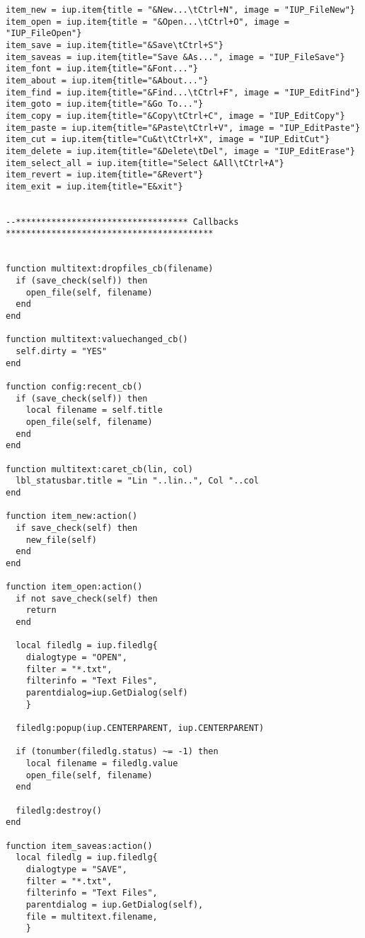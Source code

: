 \documentclass{ctexart}
\begin{document}
\begin{lstlisting}
item_new = iup.item{title = "&New...\tCtrl+N", image = "IUP_FileNew"}
item_open = iup.item{title = "&Open...\tCtrl+O", image = "IUP_FileOpen"}
item_save = iup.item{title="&Save\tCtrl+S"}
item_saveas = iup.item{title="Save &As...", image = "IUP_FileSave"}
item_font = iup.item{title="&Font..."}
item_about = iup.item{title="&About..."}
item_find = iup.item{title="&Find...\tCtrl+F", image = "IUP_EditFind"}
item_goto = iup.item{title="&Go To..."}
item_copy = iup.item{title="&Copy\tCtrl+C", image = "IUP_EditCopy"}
item_paste = iup.item{title="&Paste\tCtrl+V", image = "IUP_EditPaste"}
item_cut = iup.item{title="Cu&t\tCtrl+X", image = "IUP_EditCut"}
item_delete = iup.item{title="&Delete\tDel", image = "IUP_EditErase"}
item_select_all = iup.item{title="Select &All\tCtrl+A"}
item_revert = iup.item{title="&Revert"}
item_exit = iup.item{title="E&xit"}


--********************************** Callbacks *****************************************


function multitext:dropfiles_cb(filename)
  if (save_check(self)) then
    open_file(self, filename)
  end
end

function multitext:valuechanged_cb()
  self.dirty = "YES"
end

function config:recent_cb()
  if (save_check(self)) then
    local filename = self.title
    open_file(self, filename)
  end
end

function multitext:caret_cb(lin, col)
  lbl_statusbar.title = "Lin "..lin..", Col "..col
end

function item_new:action()
  if save_check(self) then
    new_file(self)
  end
end

function item_open:action()
  if not save_check(self) then
    return
  end
  
  local filedlg = iup.filedlg{
    dialogtype = "OPEN", 
    filter = "*.txt", 
    filterinfo = "Text Files", 
    parentdialog=iup.GetDialog(self)
    }
    
  filedlg:popup(iup.CENTERPARENT, iup.CENTERPARENT)
  
  if (tonumber(filedlg.status) ~= -1) then
    local filename = filedlg.value
    open_file(self, filename)
  end
  
  filedlg:destroy()
end

function item_saveas:action()
  local filedlg = iup.filedlg{
    dialogtype = "SAVE", 
    filter = "*.txt", 
    filterinfo = "Text Files", 
    parentdialog = iup.GetDialog(self),
    file = multitext.filename,
    }


\end{lstlisting}
\end{document}
